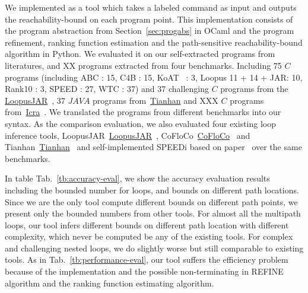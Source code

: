 We implemented {\THESYSTEM} as a tool which takes a labeled command as input  
and outputs the reachability-bound on each program point.
This implementation consists of the 
program abstraction from Section~\ref{sec:progabs} in OCaml and the program refinement, ranking function estimation and the path-sensitive reachability-bound algorithm in Python.
We evaluated it on our self-extracted programs from literatures, and XX programs extracted from four benchmarks. 
Including 75 $C$ programs (including ABC : 15, C4B : 15, KoAT~\cite{BrockschmidtEFFG14,FalkeKS12,FalkeKS11} : 3, Loopus 11 + 14 + JAR: 10, Rank10 : 3, SPEED : 27, WTC : 37) and 37 challenging $C$ programs 
from the \hyperlink{https://forsyte.at/static/people/sinn/loopusJAR/index.html}{LoopusJAR}~\cite{SinnZV17},
37 $JAVA$ programs from~\hyperlink{https://zenodo.org/record/5140586\#.Y5pBoC-B1QI}{Tianhan}\cite{LuCT21}
and XXX $C$ programs from~\hyperlink{https://github.com/icra-team/icra}{Icra}~\cite{KincaidBCR19,CyphertBKR19}.
We translated the programs from different benchmarks into our syntax.
As the comparison evaluation, we also evaluated four existing loop inference tools, 
LoopusJAR~\hyperlink{https://forsyte.at/software/loopus/}{LoopusJAR}~\cite{SinnZV17},
CoFloCo~\hyperlink{https://github.com/aeflores/CoFloCo/tree/master/src}{CoFloCo}~\cite{Montoya17,Flores-Montoya16,Flores-MontoyaH14}
and Tianhan~\hyperlink{https://zenodo.org/record/5140586\#.Y5pBoC-B1QI}{Tianhan}~\cite{LuCT21}
and self-implemented SPEEDi based on paper~\cite{GulwaniJK09}
over the same benchmarks.

In table Tab.~\ref{tb:accuracy-eval}, we show the accuracy evaluation results including the bounded number for loops, and bounds on different path locations.
Since we are the only tool compute different bounds on different path points, we present only the bounded numbers from other tools. For almost all the multipath loops, our tool infers different bounds on different path location with different complexity, which never be computed be any of the existing tools.
For complex and challenging nested loops, we do slightly worse but still comparable to existing tools.
As in Tab.~\ref{tb:performance-eval}, our tool suffers the efficiency problem because of the implementation and the possible non-terminating in REFINE algorithm and the ranking function estimating algorithm.


